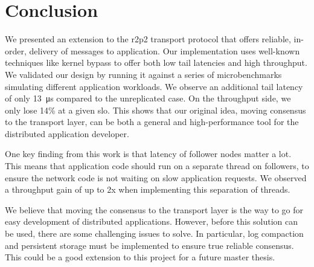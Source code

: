 \chapter{Conclusion}

We presented an extension to the \gls{r2p2} transport protocol that offers reliable, in-order, delivery of messages to application.
Our implementation uses well-known techniques like kernel bypass to offer both low tail latencies and high throughput.
We validated our design by running it against a series of microbenchmarks simulating different application workloads.
We observe an additional tail latency of only \SI{13}{\micro\second} compared to the unreplicated case.
On the throughput side, we only lose 14\% at a given \gls{slo}.
This shows that our original idea, moving consensus to the transport layer, can be both a general and high-performance tool for the distributed application developer. 

One key finding from this work is that latency of follower nodes matter a lot.
This means that application code should run on a separate thread on followers, to ensure the network code is not waiting on slow application requests.
We observed a throughput gain of up to 2x when implementing this separation of threads.

We believe that moving the consensus to the transport layer is the way to go for easy development of distributed applications.
However, before this solution can be used, there are some challenging issues to solve.
In particular, log compaction and persistent storage must be implemented to ensure true reliable consensus.
This could be a good extension to this project for a future master thesis.

